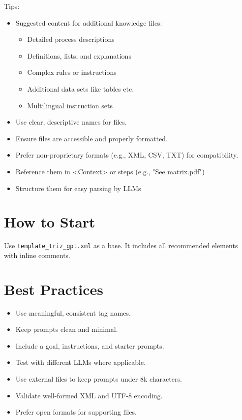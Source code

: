 \documentclass[a4paper,11pt]{refart}
\begin{document}
Tips:
\begin{itemize}
  \item Suggested content for additional knowledge files:
  \begin{itemize}
    \item Detailed process descriptions
    \item Definitions, lists, and explanations
    \item Complex rules or instructions
    \item Additional data sets like tables etc.
    \item Multilingual instruction sets  
  \end{itemize}
  \item Use clear, descriptive names for files.
  \item Ensure files are accessible and properly formatted.
  \item Prefer non-proprietary formats (e.g., XML, CSV, TXT) for compatibility.
  \item Reference them in <Context> or steps (e.g., "See matrix.pdf")
  \item Structure them for easy parsing by LLMs
\end{itemize}
  
\section{How to Start}
Use \lstinline!template_triz_gpt.xml! as a base. It includes all recommended elements with inline comments.

\section{Best Practices}
\begin{itemize}
  \item Use meaningful, consistent tag names.
  \item Keep prompts clean and minimal.
  \item Include a goal, instructions, and starter prompts.
  \item Test with different LLMs where applicable.
  \item Use external files to keep prompts under 8k characters.
  \item Validate well-formed XML and UTF-8 encoding.
  \item Prefer open formats for supporting files.
\end{itemize}
\end{document}
